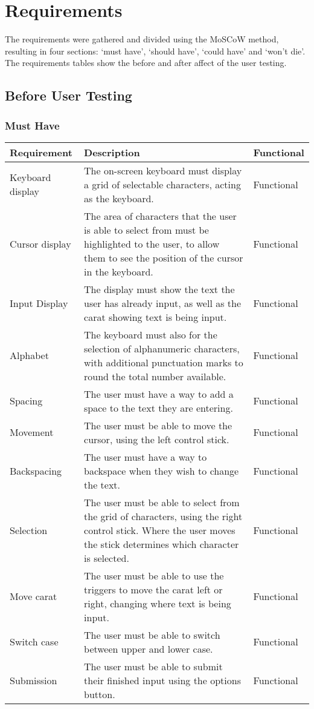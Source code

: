 \documentclass[requirements.tex]{subfiles}
\begin{document}
\section{Requirements} %
\label{sec:requirements}
The requirements were gathered and divided using the MoSCoW method, resulting
in four sections: `must have', `should have', `could have' and `won't die'. The
requirements tables show the before and after affect of the user testing.

\subsection{Before User Testing} %
\label{sub:before_user_testing}
\subsubsection{Must Have} %
\label{ssub:before_must_have}
\begin{table}[H]
\scriptsize
\begin{tabularx}{\textwidth}{| l | X | l |}
 \hline
 \textbf{Requirement} & \textbf{Description} & \textbf{Functional} \\
 \hline
 Keyboard display & The on-screen keyboard must display a grid of selectable
 characters, acting as the keyboard. & Functional \\
 \hline
 Cursor display & The area of characters that the user is able to select from
 must be highlighted to the user, to allow them to see the position of the
 cursor in the keyboard. & Functional \\
 \hline
 Input Display & The display must show the text the user has already input, as
 well as the carat showing text is being input. & Functional \\
 \hline
 Alphabet & The keyboard must also for the selection of alphanumeric characters,
 with additional punctuation marks to round the total number available. &
 Functional \\
 \hline
 Spacing & The user must have a way to add a space to the text they are
 entering. & Functional \\
 \hline
 Movement & The user must be able to move the cursor, using the left control
 stick. & Functional \\
 \hline
 Backspacing & The user must have a way to backspace when they wish to change
 the text. & Functional \\
 \hline
 Selection & The user must be able to select from the grid of characters, using
 the right control stick. Where the user moves the stick determines which
 character is selected. & Functional \\
 \hline
 Move carat & The user must be able to use the triggers to move the carat left
 or right, changing where text is being input. & Functional \\
 \hline
 Switch case & The user must be able to switch between upper and lower case.
 & Functional \\
 \hline
 Submission & The user must be able to submit their finished input using the
 options button. & Functional \\
 \hline
\end{tabularx}
\end{table}
\end{document}
